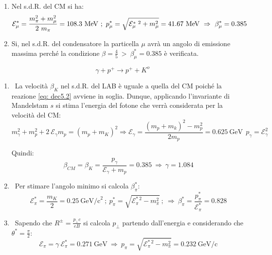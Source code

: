 \documentclass[12pt,twoside,a4]{article}
\begin{document}
\begin{solution}
\begin{enumerate}[label=(\textit{\roman*})]
\item Nel s.d.R. del CM si ha: \begin{equation*}
    \mathcal{E}^\ast_\mu = \frac{m^2_\pi + m^2_\mu}{2 \ m_\pi} = 108.3 \ \mev \ ;  \  p^\ast_\mu = \sqrt{\mathcal{E}^{\ast \ 2}_\mu + m^2_\mu} = 41.67 \ \mev  \  \Rightarrow  \  \beta^\ast_\mu = 0.385  
\end{equation*}

\item Si, nel s.d.R. del condensatore la particella $\mu$ avrà un angolo di emissione massima perché la condizione $\beta = \frac{4}{5} \ > \ \beta^\ast_\mu = 0.385$ è verificata.
\end{enumerate}
\end{solution}

\newpage
\begin{solution}
\begin{equation}
    \label{eq: dec5.2}
    \gamma + p^+ \rightarrow p^+ + K^o
\end{equation}
\begin{enumerate}[label=(\textit{\roman*})]
\item \ La velocità $\beta_K$ nel s.d.R. del LAB è uguale a quella del CM poiché la reazione \ref{eq: dec5.2} avviene in soglia. Dunque, applicando l'invariante di Mandelstam $s$ si stima l'energia del fotone che verrà considerata per la velocità del CM: \begin{equation*}
 m^2_\gamma + m^2_p + 2 \ \mathcal{E}_\gamma m_p = (m_p + m_K)^2 \Rightarrow \boxed{ \mathcal{E}_\gamma = \frac{(m_p + m_k)^2 - m^2_p}{2 m_p} = 0.625 \ \mathrm{GeV} } \  \ p_\gamma = \mathcal{E}^2_\gamma 
\end{equation*}

Quindi: \begin{equation*}
\beta_{CM} = \beta_K = \frac{p_\gamma }{\mathcal{E}_\gamma + m_p} = 0.385  \  \Rightarrow  \  \gamma = 1.084   
\end{equation*}

\bigskip
\item \ Per stimare l'angolo minimo si calcola $\beta^\ast_\pi$: \begin{equation*}
 \mathcal{E}^\ast_\pi = \frac{m_K}{2} = 0.25 \ \mathrm{GeV/c}^2 \ ;  \  p^\ast_\pi = \sqrt{\mathcal{E}^{\ast \ 2}_\pi - m^2_\pi} \ ;  \  \Rightarrow  \  \beta^\ast_\pi = \frac{p^\ast_\pi}{\mathcal{E}^\ast_\pi} = 0.828  
\end{equation*}

\bigskip
\item \ Sapendo che $R^{\pm} = \frac{p_\bot c}{e B}$ si calcola $p_\bot$ partendo dall'energia e considerando che $\theta^\ast = \frac{\pi}{2}$: \begin{equation*}
   \mathcal{E}_\pi = \gamma \ \mathcal{E}^\ast_\pi = 0.271 \ \mathrm{GeV}  \  \Rightarrow  \  p_\pi = \sqrt{\mathcal{E}^{\ast \ 2}_\pi - m^2_\pi} = 0.232 \ \mathrm{GeV/c} 
\end{equation*}


\end{enumerate}
\end{solution}
\end{document}
